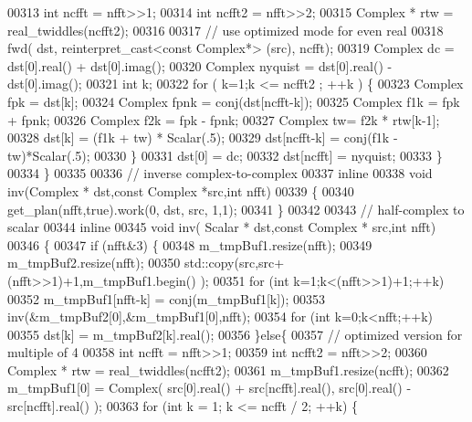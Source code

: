\begin{DoxyCode}
00313         \textcolor{keywordtype}{int} ncfft = nfft>>1;
00314         \textcolor{keywordtype}{int} ncfft2 = nfft>>2;
00315         Complex * rtw = real\_twiddles(ncfft2);
00316 
00317         \textcolor{comment}{// use optimized mode for even real}
00318         fwd( dst, reinterpret\_cast<const Complex*> (src), ncfft);
00319         Complex dc = dst[0].real() +  dst[0].imag();
00320         Complex nyquist = dst[0].real() -  dst[0].imag();
00321         \textcolor{keywordtype}{int} k;
00322         \textcolor{keywordflow}{for} ( k=1;k <= ncfft2 ; ++k ) \{
00323           Complex fpk = dst[k];
00324           Complex fpnk = conj(dst[ncfft-k]);
00325           Complex f1k = fpk + fpnk;
00326           Complex f2k = fpk - fpnk;
00327           Complex tw= f2k * rtw[k-1];
00328           dst[k] =  (f1k + tw) * Scalar(.5);
00329           dst[ncfft-k] =  conj(f1k -tw)*Scalar(.5);
00330         \}
00331         dst[0] = dc;
00332         dst[ncfft] = nyquist;
00333       \}
00334     \}
00335 
00336   \textcolor{comment}{// inverse complex-to-complex}
00337   \textcolor{keyword}{inline}
00338     \textcolor{keywordtype}{void} inv(Complex * dst,\textcolor{keyword}{const} Complex  *src,\textcolor{keywordtype}{int} nfft)
00339     \{
00340       get\_plan(nfft,\textcolor{keyword}{true}).work(0, dst, src, 1,1);
00341     \}
00342 
00343   \textcolor{comment}{// half-complex to scalar}
00344   \textcolor{keyword}{inline}
00345     \textcolor{keywordtype}{void} inv( Scalar * dst,\textcolor{keyword}{const} Complex * src,\textcolor{keywordtype}{int} nfft) 
00346     \{
00347       \textcolor{keywordflow}{if} (nfft&3) \{
00348         m\_tmpBuf1.resize(nfft);
00349         m\_tmpBuf2.resize(nfft);
00350         std::copy(src,src+(nfft>>1)+1,m\_tmpBuf1.begin() );
00351         \textcolor{keywordflow}{for} (\textcolor{keywordtype}{int} k=1;k<(nfft>>1)+1;++k)
00352           m\_tmpBuf1[nfft-k] = conj(m\_tmpBuf1[k]);
00353         inv(&m\_tmpBuf2[0],&m\_tmpBuf1[0],nfft);
00354         \textcolor{keywordflow}{for} (\textcolor{keywordtype}{int} k=0;k<nfft;++k)
00355           dst[k] = m\_tmpBuf2[k].real();
00356       \}\textcolor{keywordflow}{else}\{
00357         \textcolor{comment}{// optimized version for multiple of 4}
00358         \textcolor{keywordtype}{int} ncfft = nfft>>1;
00359         \textcolor{keywordtype}{int} ncfft2 = nfft>>2;
00360         Complex * rtw = real\_twiddles(ncfft2);
00361         m\_tmpBuf1.resize(ncfft);
00362         m\_tmpBuf1[0] = Complex( src[0].real() + src[ncfft].real(), src[0].real() - src[ncfft].real() );
00363         \textcolor{keywordflow}{for} (\textcolor{keywordtype}{int} k = 1; k <= ncfft / 2; ++k) \{

\end{DoxyCode}
